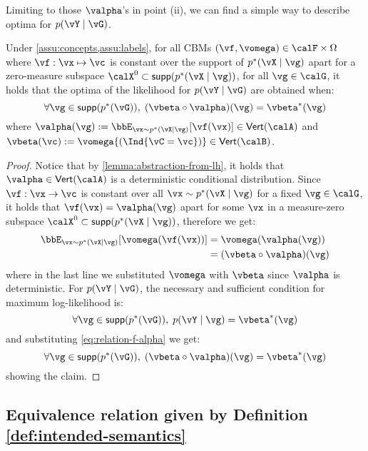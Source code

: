Limiting to those $\valpha$'s in point (ii), we can find a simple way to describe optima for $p (\vY \mid \vG)$. 

\begin{lemma}
    \label{lemma:deterministic-optima}
    Under \cref{assu:concepts,assu:labels}, 
    for all CBMs $(\vf, \vomega) \in \calF \times \Omega$ where $\vf:\vx \mapsto \vc$ is constant over the support of $p^*(\vX \mid \vg)$ apart for a zero-measure subspace $\calX^0 \subset \mathsf{supp}{( p^*(\vX \mid \vg))}$, for all $\vg \in \calG$, it holds that the optima of the likelihood for $p(\vY \mid \vG)$ are obtained when:
    \[
        \forall \vg \in \mathsf{supp}(p^*(\vG)), \; (\vbeta \circ \valpha)(\vg) = \vbeta^* (\vg)
    \]
    where $\valpha (\vg) :=  \bbE_{\vx \sim p^*(\vX \mid \vg)} [ \vf(\vx) ]  \in \Vset{\calA} $ and $\vbeta (\vc) := \vomega{( \Ind{\vC = \vc}) } \in \Vset{\calB} $. 
\end{lemma}

\begin{proof}
    Notice that by \cref{lemma:abstraction-from-lh}, it holds that $\valpha \in \Vset{\calA}$ is a deterministic conditional distribution. 
    Since $\vf: \vx \to \vc$ is constant over all $\vx \sim p^*(\vX \mid \vg)$ for a fixed $\vg \in \calG$,
     it holds that $\vf(\vx) = \valpha (\vg)$
    apart for some $\vx$ in a measure-zero subspace $\calX^0 \subset \mathsf{supp}{( p^*(\vX \mid \vg))}$,
   therefore we get:
    \begin{align}
        \bbE_{\vx \sim p^*(\vX \mid \vg) } [ \vomega (\vf (\vx))] &= \vomega( \valpha(\vg)) \\
        &= (\vbeta \circ \valpha) (\vg)
        \label{eq:relation-f-alpha}
    \end{align}
    where in the last line we substituted $\vomega$ with $\vbeta$ since $\valpha$ is deterministic. For $p (\vY \mid \vG)$, the necessary and sufficient condition for maximum log-likelihood is:
    \[
        \forall \vg \in \mathsf{supp}(p^*(\vG)), \; p(\vY \mid \vg) = \vbeta^* (\vg)
    \]
    and substituting \cref{eq:relation-f-alpha} we get:
    \[
        \forall \vg \in \mathsf{supp}(p^*(\vG)), \; (\vbeta \circ \valpha) (\vg) = \vbeta^* (\vg)
    \]
    showing the claim.
\end{proof}





\subsection{Equivalence relation given by Definition \ref{def:intended-semantics}}


